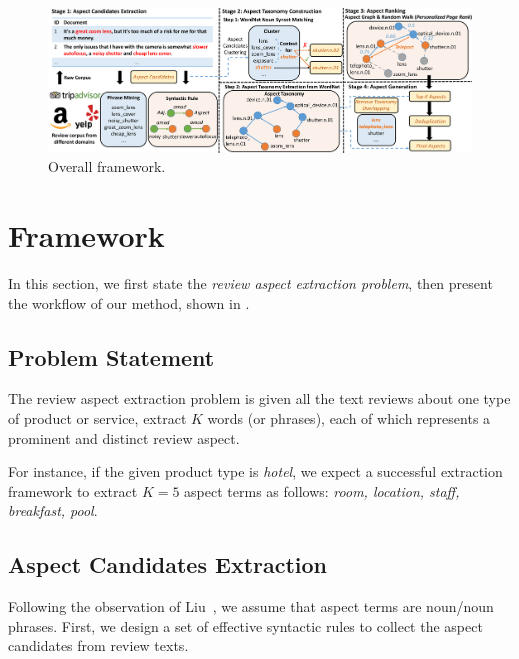 \begin{figure}[th!]
	\centering
	\includegraphics[width=\textwidth]{figures/framework}
	\caption{Overall framework.}
	\label{fig:framework}
\end{figure}
\section{Framework}
\label{sec:method}
In this section, we first state the \textit{review aspect extraction problem}, 
then present the workflow of our method, shown in .

\subsection{Problem Statement}
\label{sec:problem}
The review aspect extraction problem is given all the text reviews about
one type of product or service, extract $K$ words (or phrases), 
each of which represents a prominent and distinct review aspect. 

For instance, if the given product type is \textit{hotel}, 
we expect a successful extraction framework to extract 
$K=5$ aspect terms as follows: 
\textit{room, location, staff, breakfast, pool}.

\subsection{Aspect Candidates Extraction}
\label{sec:candidate}
Following the observation of Liu~, 
we assume that aspect terms are noun/noun phrases.  
First, we design a set of effective syntactic rules to collect the aspect candidates from review texts.

